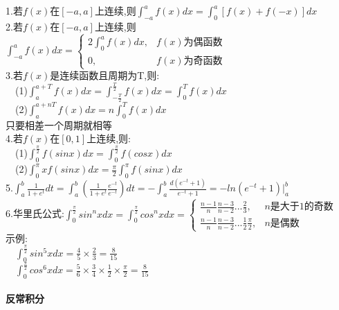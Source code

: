 \documentclass{article}
\begin{document}
\begin{flushleft}
	1.若$f(x)$在$[-a,a]$上连续,则$\int_{-a}^{a}f(x)dx=\int_{0}^{a}[f(x)+f(-x)]dx$\\
	2.若$f(x)$在$[-a,a]$上连续,则$\int_{-a}^{a}f(x)dx=\left\{
	\begin{array}{lcl}
	2\int_{0}^{a}f(x)dx, & f(x)\mbox{为偶函数}\\
	0, & f(x)\mbox{为奇函数}
	\end{array} \right.$\\
	3.若$f(x)$是连续函数且周期为T,则:\\
	\ \ (1)$\int_{a}^{a+T}f(x)dx=\int_{-\frac{T}{2}}^{\frac{T}{2}}f(x)dx=\int_{0}^{T}f(x)dx$\\
	\ \ (2)$\int_{a}^{a+nT}f(x)dx=n\int_{0}^{T}f(x)dx$\\
	只要相差一个周期就相等\\
	4.若$f(x)$在$[0,1]$上连续,则:\\
	\ \ (1)$\int_{0}^{\frac{\pi}{2}}f(sinx)dx=\int_{0}^{\frac{\pi}{2}}f(cosx)dx$\\
	\ \ (2)$\int_{0}^{\pi}xf(sinx)dx=\frac{\pi}{2}\int_{0}^{\pi}f(sinx)dx$\\
	5.$\int_{a}^{b}\frac{1}{1+e^t}dt=\int_{a}^{b}(\frac{1}{1+e^t}\frac{e^{-t}}{e^{-t}})dt=-\int_{a}^{b}\frac{d(e^{-t}+1)}{e^{-t}+1}=-ln(e^{-t}+1)|_a^b$\\
	6.华里氏公式:$\int_{0}^{\frac{\pi}{2}}sin^nxdx=\int_{0}^{\frac{\pi}{2}}cos^nxdx=\left\{
	\begin{array}{lcl}
	\frac{n-1}{n}\frac{n-3}{n-2}...\frac{2}{3}, & n\mbox{是大于1的奇数}\\
	\frac{n-1}{n}\frac{n-3}{n-2}...\frac{1}{2}\frac{\pi}{2}, & n\mbox{是偶数}
	\end{array} \right.$\\
	示例:\\
	\ \ $\int_{0}^{\frac{\pi}{2}}sin^5xdx=\frac{4}{5}\times\frac{2}{3}=\frac{8}{15}$\\
	\ \ $\int_{0}^{\frac{\pi}{2}}cos^6xdx=\frac{5}{6}\times\frac{3}{4}\times\frac{1}{2}\times\frac{\pi}{2}=\frac{8}{15}$\\
	
	~\\ \textbf{反常积分} \\~\\
	

\end{flushleft}
\end{document}
